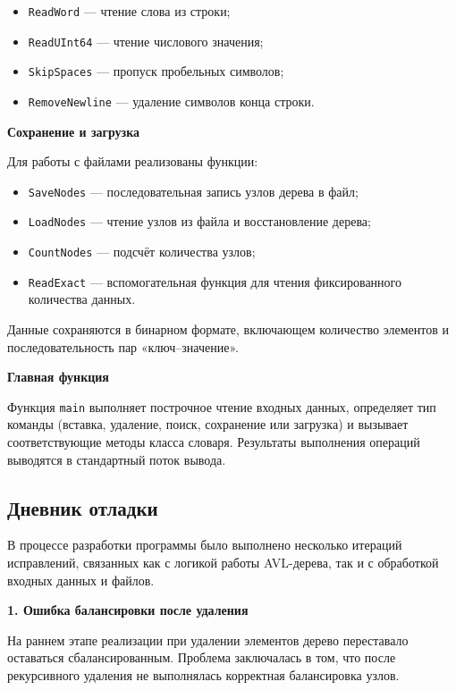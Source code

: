 \documentclass[12pt]{article}
\begin{document}
\begin{itemize}
	\item \texttt{ReadWord} --- чтение слова из строки;
	\item \texttt{ReadUInt64} --- чтение числового значения;
	\item \texttt{SkipSpaces} --- пропуск пробельных символов;
	\item \texttt{RemoveNewline} --- удаление символов конца строки.
\end{itemize}

\textbf{Сохранение и загрузка}

Для работы с файлами реализованы функции:

\begin{itemize}
	\item \texttt{SaveNodes} --- последовательная запись узлов дерева в файл;
	\item \texttt{LoadNodes} --- чтение узлов из файла и восстановление дерева;
	\item \texttt{CountNodes} --- подсчёт количества узлов;
	\item \texttt{ReadExact} --- вспомогательная функция для чтения фиксированного количества данных.
\end{itemize}

Данные сохраняются в бинарном формате, включающем количество элементов и последовательность пар «ключ--значение».

\textbf{Главная функция}

Функция \texttt{main} выполняет построчное чтение входных данных, определяет тип команды (вставка, удаление, поиск, сохранение или загрузка) и вызывает соответствующие методы класса словаря. Результаты выполнения операций выводятся в стандартный поток вывода.



\subsection*{Дневник отладки}

В процессе разработки программы было выполнено несколько итераций исправлений, связанных как с логикой работы AVL-дерева, так и с обработкой входных данных и файлов.

\vspace{1\baselineskip}
\textbf{1. Ошибка балансировки после удаления}
\vspace{1\baselineskip}

На раннем этапе реализации при удалении элементов дерево переставало оставаться сбалансированным. Проблема заключалась в том, что после рекурсивного удаления не выполнялась корректная балансировка узлов.
\end{document}
